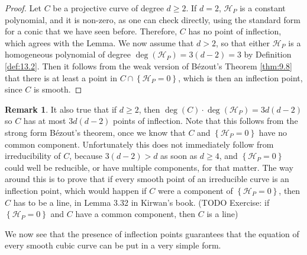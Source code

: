 \documentclass{article}
\newcommand{\rb}[1]{\left( #1 \right)}
\newcommand{\cb}[1]{\left\{ #1 \right\}}
\theoremstyle{definition}\newtheorem{definition}{Definition}[section]
\theoremstyle{definition}\newtheorem{notation}[definition]{Notation}
\theoremstyle{definition}\newtheorem{remark}[definition]{Remark}
\theoremstyle{definition}\newtheorem{example}[definition]{Example}
\theoremstyle{definition}\newtheorem{fact}{Fact}
\theoremstyle{definition}\newtheorem{exercise}{Exercise}
\begin{document}
\begin{proof}
Let $ C $ be a projective curve of degree $ d \ge 2 $. If $ d = 2 $, $ \mathcal{H}_P $ is a constant polynomial, and it is non-zero, as one can check directly, using the standard form for a conic that we have seen before. Therefore, $ C $ has no point of inflection, which agrees with the Lemma. We now assume that $ d > 2 $, so that either $ \mathcal{H}_P $ is a homogeneous polynomial of degree $ \deg\rb{\mathcal{H}_P} = 3\rb{d - 2} = 3 $ by Definition \ref{def:13.2}. Then it follows from the weak version of Bézout's Theorem \ref{thm:9.8} that there is at least a point in $ C \cap \cb{\mathcal{H}_P = 0} $, which is then an inflection point, since $ C $ is smooth.
\end{proof}

\begin{remark}
It also true that if $ d \ge 2 $, then $ \deg\rb{C} \cdot \deg\rb{\mathcal{H}_P} = 3d\rb{d - 2} $ so $ C $ has at most $ 3d\rb{d - 2} $ points of inflection. Note that this follows from the strong form Bézout's theorem, once we know that $ C $ and $ \cb{\mathcal{H}_P = 0} $ have no common component. Unfortunately this does not immediately follow from irreducibility of $ C $, because $ 3\rb{d - 2} > d $ as soon as $ d \ge 4 $, and $ \cb{\mathcal{H}_P = 0} $ could well be reducible, or have multiple components, for that matter. The way around this is to prove that if every smooth point of an irreducible curve is an inflection point, which would happen if $ C $ were a component of $ \cb{\mathcal{H}_P = 0} $, then $ C $ has to be a line, in Lemma 3.32 in Kirwan's book. (TODO Exercise: if $ \cb{\mathcal{H}_P = 0} $ and $ C $ have a common component, then $ C $ is a line)
\end{remark}

We now see that the presence of inflection points guarantees that the equation of every smooth cubic curve can be put in a very simple form.
\end{document}

